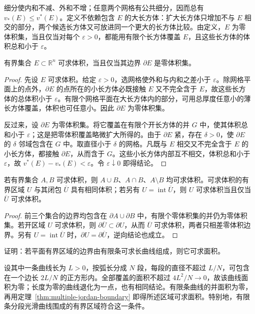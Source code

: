 细分使内和不减、外和不增；任意两个网格有公共细分，因而总有 $v_*(E)\leq v^*(E)$。定义不依赖包含 $E$ 的大长方体：扩大长方体只增加不与 $E$ 相交的部分，两个候选长方体又可放进同一个更大的长方体比较。由定义，$E$ 为零体积集，当且仅当对每个 $\varepsilon>0$，都能用有限个长方体覆盖 $E$，且这些长方体的体积总和小于 $\varepsilon$。

\begin{theorem}
\label{thm:multiple-jordan-boundary}
有界集合 $E\subset\mathbb R^n$ 可求体积，当且仅当其边界 $\partial E$ 是零体积集。
\end{theorem}
\begin{proof}
先设 $E$ 可求体积。给定 $\varepsilon>0$，选网格使外和与内和之差小于 $\varepsilon$。除网格平面上的点外，$\partial E$ 的点所在的小长方体必既接触 $E$ 又不完全含于 $E$，故这些长方体的总体积小于 $\varepsilon$。有限个网格平面在大长方体内的部分，可用总厚度任意小的薄长方体覆盖，体积也可任意小。因此 $\partial E$ 为零体积集。

反过来，设 $\partial E$ 为零体积集。将它覆盖在有限个开长方体的并 $G$ 中，使其体积总和小于 $\varepsilon$；这是把零体积覆盖略微扩大所得的。由于 $\partial E$ 紧，存在 $\delta>0$，使 $\partial E$ 的 $\delta$ 邻域包含在 $G$ 中。取直径小于 $\delta$ 的网格。凡既与 $E$ 相交又不完全含于 $E$ 的小长方体，都接触 $\partial E$，从而含于 $G$。这些小长方体内部互不相交，体积总和小于 $\varepsilon$，故 $v^*(E)-v_*(E)<\varepsilon$。令 $\varepsilon\downarrow0$ 即得结论。
\end{proof}

\begin{corollary}
\label{cor:multiple-jordan-set-operations}
若有界集合 $A,B$ 可求体积，则 $A\cup B$、$A\cap B$、$A\setminus B$ 均可求体积。可求体积的有界区域 $U$ 与其闭包 $\overline U$ 具有相同体积；若另有 $U=\operatorname{int}\overline U$，则 $U$ 可求体积当且仅当 $\overline U$ 可求体积。
\end{corollary}
\begin{proof}
前三个集合的边界均包含在 $\partial A\cup\partial B$ 中，有限个零体积集的并仍为零体积集。若开区域 $U$ 可求体积，则 $\partial\overline U\subset\partial U$，从而 $\overline U$ 可求体积，两者只相差零体积边界。另有 $U=\operatorname{int}\overline U$ 时，$\partial U=\partial\overline U$，逆向结论也成立。
\end{proof}

\begin{example}
\label{ex:multiple-rectifiable-boundary}
证明：若平面有界区域的边界由有限条可求长曲线组成，则它可求面积。
\end{example}
\begin{solve}
设其中一条曲线长为 $L>0$，按弧长分成 $N$ 段，每段的直径不超过 $L/N$，可包含在一个边长 $2L/N$ 的正方形内。全部覆盖的面积不超过 $4L^2/N\to0$，故该曲线面积为零；长度为零的曲线退化为一点，也有相同结论。有限条曲线的并面积为零，再用定理~\ref{thm:multiple-jordan-boundary} 即得所述区域可求面积。特别地，有限条分段光滑曲线围成的有界区域符合这一条件。
\end{solve}

